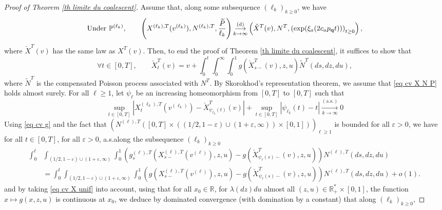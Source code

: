 \documentclass[11pt]{article}
\numberwithin{equation}{section}
\def\vp{\varepsilon}
\def \R{\mathbb {R}}
\def\P{\mathbb{P}}
\begin{document}
\begin{proof}[Proof of Theorem \ref{th limite du coalescent}]
	Assume that, along some subsequence $(\ell_k)_{k\ge 0}$, we have 
	\begin{equation}\label{eq cv X N P}
	\text{Under }\P^{(\ell_k)}, \qquad
	\left(X^{(\ell_k),T}(v^{(\ell_k)}), N^{(\ell_k),T}, \frac{\widetilde{P}}{\ell_k}
	\right)
	\mathop{\longrightarrow}\limits_{k \to \infty}^{(\mathrm{d})}
	\left(\check{X}^T(v), N^T, \left(\exp(\xi_a(2 c_a p_{\bf q}t))\right)_{t\ge 0} 
	\right),
	\end{equation}
	where $\check{X}^T(v)$ has the same law as $X^T(v)$. Then, to end the proof of Theorem \ref{th limite du coalescent}, it suffices to show that 
	\begin{equation}\label{eq identification de la limite}
	\forall t \in [0,T], \qquad \check{X}^T_t(v) = v + \int_0^t \int_0^\infty \int_0^1 g(\check{X}^T_{s-}(v), z,u)\widetilde{N}^T(ds,dz,du),
	\end{equation}
	where $\widetilde{N}^T$ is the compensated Poisson process associated with $N^T$.
	By Skorokhod's representation theorem, we assume that \eqref{eq cv X N P} holds almost surely. For all $\ell\ge 1$, let $\psi_\ell$ be an increasing  homeomorphism from $[0,T]$ to $[0,T]$ such that
	\begin{equation}\label{eq cv X unif}
	\sup_{t \in [0,T]} \left\vert 
	X^{(\ell_k), T}_t(v^{(\ell_k)}) - \check{X}^T_{\psi_{\ell_k}(t)}(v)
	\right\vert
	+\sup_{t \in[0,T]} \left\vert \psi_{\ell_k}(t)-t \right\vert
	\mathop{\longrightarrow}\limits_{k\to \infty}^{(\mathrm{a.s.})} 0
	\end{equation}
	Using \eqref{eq cv g} and the fact that $(N^{(\ell),T}([0,T]\times ((1/2,1-\vp)\cup(1+\vp,\infty))\times[0,1]))_{\ell \ge 1}$ is bounded for all $\vp >0$, we have for all $t\in [0,T]$, for all $\vp>0$, a.s.\@ along the subsequence $(\ell_k)_{k\ge 0}$
	\begin{align*}
		\int_0^t &\int_{(1/2,1-\vp)\cup(1+\vp, \infty)} \int_0^1
		\left( g^{(\ell),T}_s(X^{(\ell),T}_{s-}(v^{(\ell)}), z, u) 
		-
		g(\check{X}^{T}_{\psi_\ell(s)-}(v), z, u)\right) N^{(\ell),T}(ds,dz,du) \\
		&= \int_0^t\int_{(1/2,1-\vp)\cup(1+\vp, \infty)} \int_0^1
		\left(g(X^{(\ell),T}_{s-}(v^{(\ell)}), z, u) -g(\check{X}^T_{\psi_\ell(s)-}(v), z, u) \right)N^{(\ell),T}(ds,dz,du)
		+o(1).
	\end{align*}
	and by taking \eqref{eq cv X unif} into account, using that for all $x_0 \in \R$, for $\lambda(dz) du$ almost all $(z,u) \in \R_+^* \times [0,1]$, the function $x\mapsto g(x,z,u)$ is continuous at $x_0$, we deduce by dominated convergence (with domination by a constant) that along $(\ell_k)_{k\ge 0}$,

\end{proof}
\end{document}

